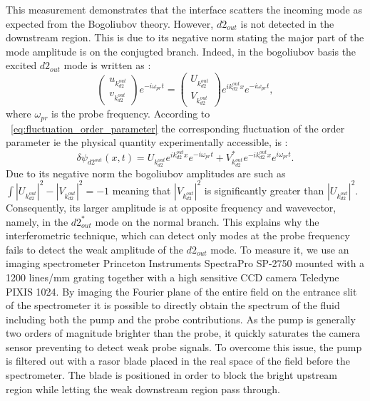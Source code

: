 This measurement demonstrates that the interface scatters the incoming mode as expected from the Bogoliubov theory. However, $d2_{out}$ is not detected in the downstream region. This is due to its negative norm stating the major part of the mode amplitude is on the conjugted branch.
Indeed, in the bogoliubov basis the excited $d2_{out}$ mode is written as :
\begin{equation}
    \begin{pmatrix}
        u_{k_{d2}^{out}} \\
        v_{k_{d2}^{out}}
    \end{pmatrix}e^{-i\omega_{pr}t}=
    \begin{pmatrix}
    U_{k_{d2}^{out}} \\
    V_{k_{d2}^{out}}
    \end{pmatrix}e^{ik_{d2}^{out}x}e^{-i\omega_{pr}t}, 
\end{equation}
where $\omega_{pr}$ is the probe frequency. According to ~\ref{eq:fluctuation_order_parameter} the corresponding fluctuation of the order parameter ie the physical quantity experimentally accessible, is :
\begin{equation}
    \delta\psi_{{d2}^{out}}(x,t)= U_{k_{d2}^{out}}e^{ik_{d2}^{out}x}e^{-i\omega_{pr}t}+V_{k_{d2}^{out}}^*e^{-ik_{d2}^{out}x}e^{i\omega_{pr}t}.
    \label{eq:order_param_d2_out}
\end{equation}
Due to its negative norm the bogoliubov amplitudes are such as $\int |U_{k_{d2}^{out}}|^2-|V_{k_{d2}^{out}}|^2=-1$ meaning that  $|V_{k_{d2}^{out}}|^2$ is significantly greater than $|U_{k_{d2}^{out}}|^2$. 
Consequently, its larger amplitude is at opposite frequency and wavevector, namely, in the $d2_{out}^*$ mode on the normal branch. This explains why the interferometric technique, which 
can detect only modes at the probe frequency fails to detect the weak amplitude of the $d2_{out}$ mode. To measure it, we use an imaging spectrometer Princeton Instruments SpectraPro SP-2750 mounted with a 1200 lines/mm grating together with a high sensitive CCD camera Teledyne PIXIS 1024. By 
imaging the Fourier plane of the entire field on the entrance slit of the spectrometer it is possible to directly obtain the spectrum of the fluid including both the pump and the probe contributions.
As the pump is generally two orders of magnitude brighter than the probe, it quickly saturates the camera sensor preventing to detect weak probe signals. To overcome this issue,
the pump is filtered out with a rasor blade placed in the real space of the field before the spectrometer. The blade is positioned in order to block the bright upstream region while letting the weak downstream region pass through.

